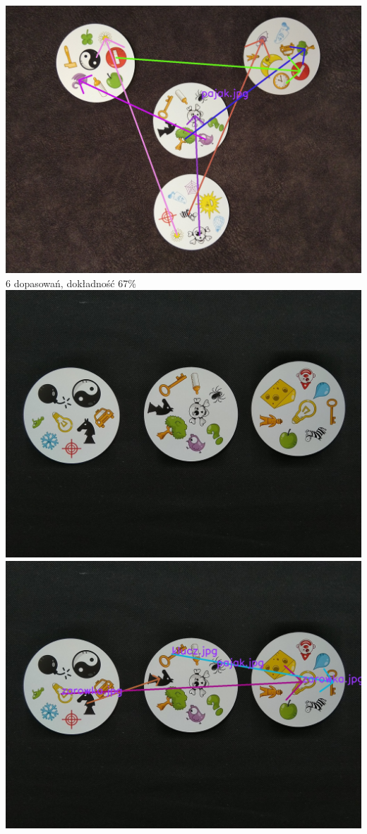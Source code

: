 \documentclass[10pt,a4paper]{article}
\begin{document}
\begin{center}
\includegraphics[scale=0.28]{easy/img_arrows4.jpg}\\
6 dopasowań, dokładność 67\%
\includegraphics[scale=0.28]{easy/dobble22.jpg}
\includegraphics[scale=0.28]{easy/img_arrows5.jpg}\\

\end{center}
\end{document}

